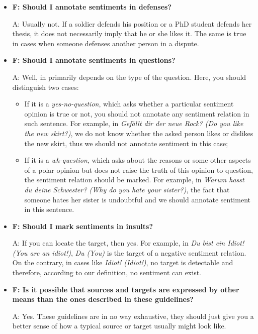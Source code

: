 \documentclass[11pt,a4paper]{article}
\begin{document}
\begin{itemize}
\item\textbf{F: Should I annotate sentiments in defenses?}

  A: Usually not.  If a soldier defends his position or a PhD student defends
  her thesis, it does not necessarily imply that he or she likes it.  The same
  is true in cases when someone defenses another person in a dispute.

\item\textbf{F: Should I annotate sentiments in questions?}

  A: Well, in primarily depends on the type of the question.  Here, you should
  distinguish two cases:
  \begin{itemize}
    \item If it is a \textit{yes-no-question}, which asks whether a particular
      sentiment opinion is true or not, you should not annotate any sentiment
      relation in such sentence.  For example, in \textit{Gef\"allt dir der
        neue Rock?  (Do you like the new skirt?)}, we do not know whether the
      asked person likes or dislikes the new skirt, thus we should not
      annotate sentiment in this case;
    \item If it is a \textit{wh-question}, which asks about the reasons or
      some other aspects of a polar opinion but does not raise the truth of
      this opinion to question, the sentiment relation should be marked.  For
      example, in \textit{Warum hasst du deine Schwester? (Why do you hate
        your sister?)}, the fact that someone hates her sister is undoubtful
      and we should annotate sentiment in this sentence.
  \end{itemize}

\item\textbf{F: Should I mark sentiments in insults?}

  A: If you can locate the target, then yes.  For example, in \textit{Du bist
    ein Idiot! (You are an idiot!)}, \textit{Du (You)} is the target of a
  negative sentiment relation.  On the contrary, in cases like \textit{Idiot!
    (Idiot!)}, no target is detectable and therefore, according to our
  definition, no sentiment can exist.

\item\textbf{F: Is it possible that sources and targets are expressed by other
  means than the ones described in these guidelines?}

  A: Yes. These guidelines are in no way exhaustive, they should just give you
  a better sense of how a typical source or target usually might look like.


\end{itemize}
\end{document}

